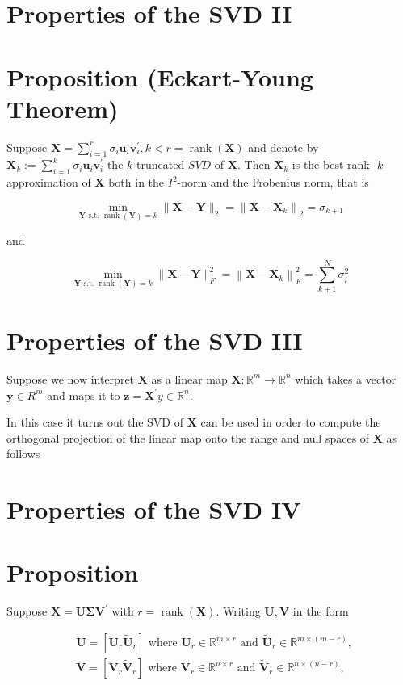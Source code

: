 \documentclass[11pt]{article}
\theoremstyle{plain} %
\theoremstyle{remark}
\begin{document}
\section*{Properties of the SVD II}
\section*{Proposition (Eckart-Young Theorem)}
Suppose $\mathbf{X}=\sum_{i=1}^{r} \sigma_{i} \mathbf{u}_{i} \mathbf{v}_{i}^{\prime}, k<r=\operatorname{rank}(\mathbf{X})$ and denote by $\mathbf{X}_{k}:=\sum_{i=1}^{k} \sigma_{i} \mathbf{u}_{i} \mathbf{v}_{i}^{\prime}$ the $k$-truncated $S V D$ of $\mathbf{X}$. Then $\mathbf{X}_{k}$ is the best rank- $k$ approximation of $\mathbf{X}$ both in the $I^{2}$-norm and the Frobenius norm, that is

$$
\min _{\mathbf{Y} \text { s.t. } \operatorname{rank}(\mathbf{Y})=k}\|\mathbf{X}-\mathbf{Y}\|_{2}=\left\|\mathbf{X}-\mathbf{X}_{k}\right\|_{2}=\sigma_{k+1}
$$

and

$$
\min _{\mathbf{Y} \text { s.t. } \operatorname{rank}(\mathbf{Y})=k}\|\mathbf{X}-\mathbf{Y}\|_{F}^{2}=\left\|\mathbf{X}-\mathbf{X}_{k}\right\|_{F}^{2}=\sum_{k+1}^{N} \sigma_{i}^{2}
$$

\section*{Properties of the SVD III}
Suppose we now interpret $\mathbf{X}$ as a linear map $\mathbf{X}: \mathbb{R}^{m} \rightarrow \mathbb{R}^{n}$ which takes a vector $\mathbf{y} \in R^{m}$ and maps it to $\mathbf{z}=\mathbf{X}^{\prime} y \in \mathbb{R}^{n}$.

In this case it turns out the SVD of $\mathbf{X}$ can be used in order to compute the orthogonal projection of the linear map onto the range and null spaces of $\mathbf{X}$ as follows

\section*{Properties of the SVD IV}
\section*{Proposition}
Suppose $\mathbf{X}=\mathbf{U} \boldsymbol{\Sigma} \mathbf{V}^{\prime}$ with $r=\operatorname{rank}(\mathbf{X})$. Writing $\mathbf{U}, \mathbf{V}$ in the form

$$
\begin{aligned}
& \mathbf{U}=\left[\mathbf{U}_{r} \widetilde{\mathbf{U}}_{r}\right] \text { where } \mathbf{U}_{r} \in \mathbb{R}^{m \times r} \text { and } \widetilde{\mathbf{U}}_{r} \in \mathbb{R}^{m \times(m-r)}, \\
& \mathbf{V}=\left[\mathbf{V}_{r} \widetilde{\mathbf{V}}_{r}\right] \text { where } \mathbf{V}_{r} \in \mathbb{R}^{n \times r} \text { and } \widetilde{\mathbf{V}}_{r} \in \mathbb{R}^{n \times(n-r)},
\end{aligned}
$$
\end{document}
